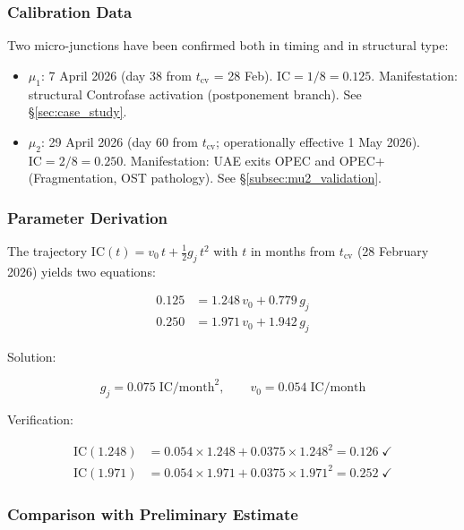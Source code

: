\documentclass[12pt,a4paper]{article}
\newcommand{\gj}{g_j}
\newcommand{\IC}{\mathrm{IC}}
\begin{document}
\subsubsection{Calibration Data}

Two micro-junctions have been confirmed both in timing and in structural type:

\begin{itemize}[leftmargin=2em]
    \item $\mu_1$: 7 April 2026 (day 38 from $t_{\mathrm{cv}}$ = 28 Feb). $\IC = 1/8 = 0.125$. Manifestation: structural Controfase activation (postponement branch). See \S\ref{sec:case_study}.
    \item $\mu_2$: 29 April 2026 (day 60 from $t_{\mathrm{cv}}$; operationally effective 1 May 2026). $\IC = 2/8 = 0.250$. Manifestation: UAE exits OPEC and OPEC+ (Fragmentation, OST pathology). See \S\ref{subsec:mu2_validation}.
\end{itemize}

\subsubsection{Parameter Derivation}

The trajectory $\IC(t) = v_0\,t + \tfrac{1}{2}\gj\,t^2$ with $t$ in months from $t_{\mathrm{cv}}$ (28 February 2026) yields two equations:

\begin{align}
0.125 &= 1.248\,v_0 + 0.779\,\gj \label{eq:cal1} \\
0.250 &= 1.971\,v_0 + 1.942\,\gj \label{eq:cal2}
\end{align}

Solution:

\begin{equation}\label{eq:gj_empirical}
\boxed{\gj = 0.075 \;\text{IC/month}^2}, \qquad \boxed{v_0 = 0.054 \;\text{IC/month}}
\end{equation}

Verification:

\begin{align*}
\IC(1.248) &= 0.054 \times 1.248 + 0.0375 \times 1.248^2 = 0.126 \;\checkmark \\
\IC(1.971) &= 0.054 \times 1.971 + 0.0375 \times 1.971^2 = 0.252 \;\checkmark
\end{align*}

\subsubsection{Comparison with Preliminary Estimate}
\end{document}
